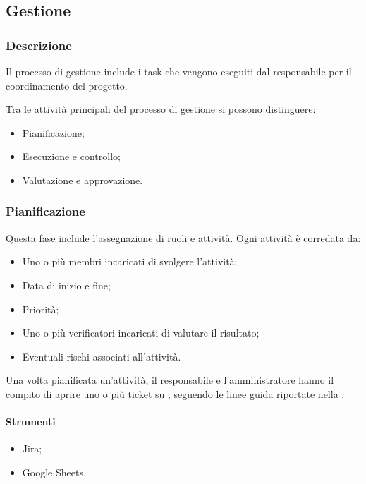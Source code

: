 \subsection{Gestione}

\subsubsection{Descrizione}
\par Il processo di gestione include i task che vengono eseguiti dal responsabile per il coordinamento del progetto.
\par Tra le attività principali del processo di gestione si possono distinguere:
\begin{itemize}
  \item Pianificazione;
  \item Esecuzione e controllo;
  \item Valutazione e approvazione.
\end{itemize}

\subsubsection{Pianificazione}
\par Questa fase include l'assegnazione di ruoli e attività. Ogni attività è corredata da:
\begin{itemize}
  \item Uno o più membri incaricati di svolgere l'attività;
  \item Data di inizio e fine;
  \item Priorità;
  \item Uno o più verificatori incaricati di valutare il risultato;
  \item Eventuali rischi associati all'attività.
\end{itemize}

\vspace{0.5\baselineskip}
\par Una volta pianificata un'attività, il responsabile e l'amministratore hanno il compito di aprire uno o più ticket su , seguendo le linee guida riportate nella .

\paragraph*{Strumenti}
\begin{itemize}
  \item Jira;
  \item Google Sheets.
\end{itemize}

